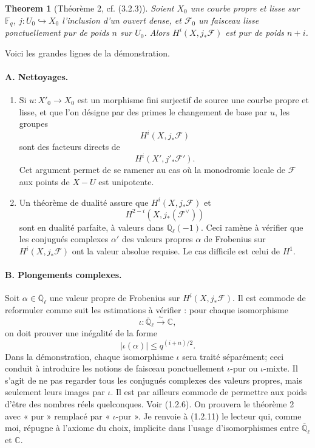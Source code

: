 \documentclass[11pt]{article}
\newtheorem{theorem}{Theorem}
\theoremstyle{remark}
\newcommand{\Ql}{\mathbb{Q}_\ell}
\newcommand{\CC}{\mathbb{C}}
\newcommand{\Fq}{\mathbb{F}_q}
\newcommand{\Abar}{\overline{\mathbb{Q}}_\ell}
\begin{document}
\begin{theorem}[Théorème 2, cf. (3.2.3)]
Soient $X_0$ une courbe propre et lisse sur $\Fq$, $j:U_0\hookrightarrow X_0$ l'inclusion d'un ouvert dense, et $\mathcal F_0$ un faisceau lisse ponctuellement pur de poids $n$ sur $U_0$. Alors $H^i(X,j_*\mathcal F)$ est pur de poids $n+i$.
\end{theorem}

Voici les grandes lignes de la démonstration.

\paragraph{A. Nettoyages.}
\begin{enumerate}[label=(\roman*)]
\item Si $u:X'_0\to X_0$ est un morphisme fini surjectif de source une courbe propre et lisse, et que l'on désigne par des primes le changement de base par $u$, les groupes
\[
H^i(X,j_*\mathcal F)
\]
sont des facteurs directs de
\[
H^i(X',j'_*\mathcal F').
\]
Cet argument permet de se ramener au cas où la monodromie locale de $\mathcal F$ aux points de $X-U$ est unipotente.
\item Un théorème de dualité assure que $H^i(X,j_*\mathcal F)$ et
\[
H^{2-i}(X,j_*(\mathcal F^\vee))
\]
sont en dualité parfaite, à valeurs dans $\Ql(-1)$. Ceci ramène à vérifier que les conjugués complexes $\alpha'$ des valeurs propres $\alpha$ de Frobenius sur $H^i(X,j_*\mathcal F)$ ont la valeur absolue requise. Le cas difficile est celui de $H^1$.
\end{enumerate}

\paragraph{B. Plongements complexes.}
Soit $\alpha\in\Abar$ une valeur propre de Frobenius sur $H^i(X,j_*\mathcal F)$. Il est commode de reformuler comme suit les estimations à vérifier : pour chaque isomorphisme
\[
\iota:\Abar\xrightarrow{\sim}\CC,
\]
on doit prouver une inégalité de la forme
\[
|\iota(\alpha)|\le q^{(i+n)/2}.
\]
Dans la démonstration, chaque isomorphisme $\iota$ sera traité séparément; ceci conduit à introduire les notions de faisceau ponctuellement $\iota$-pur ou $\iota$-mixte. Il s'agit de ne pas regarder tous les conjugués complexes des valeurs propres, mais seulement leurs images par $\iota$. Il est par ailleurs commode de permettre aux poids d'être des nombres réels quelconques. Voir (1.2.6). On prouvera le théorème 2 avec « pur » remplacé par « $\iota$-pur ». Je renvoie à (1.2.11) le lecteur qui, comme moi, répugne à l'axiome du choix, implicite dans l'usage d'isomorphismes entre $\Abar$ et $\CC$.
\end{document}
